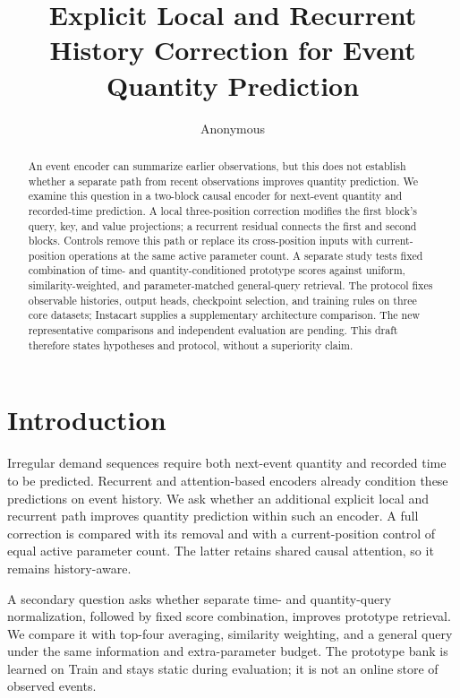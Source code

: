 \documentclass[runningheads]{llncs}
\begin{document}
\title{Explicit Local and Recurrent History Correction for Event Quantity Prediction}
\author{Anonymous}
\maketitle

\begin{abstract}
An event encoder can summarize earlier observations, but this does not
establish whether a separate path from recent observations improves
quantity prediction. We examine this question in a two-block causal
encoder for next-event quantity and recorded-time prediction.
A local three-position correction modifies the first block's query,
key, and value projections; a recurrent residual connects the first
and second blocks. Controls remove this path or replace its
cross-position inputs with current-position operations at the same
active parameter count. A separate study tests fixed combination
of time- and quantity-conditioned prototype scores against uniform,
similarity-weighted, and parameter-matched general-query retrieval.
The protocol fixes observable histories, output heads, checkpoint
selection, and training rules on three core datasets; Instacart
supplies a supplementary architecture comparison. The new
representative comparisons and independent evaluation are pending.
This draft therefore states hypotheses and protocol, without a
superiority claim.
\end{abstract}

\section{Introduction}
Irregular demand sequences require both next-event quantity and
recorded time to be predicted. Recurrent and attention-based encoders
already condition these predictions on event history. We ask whether
an additional explicit local and recurrent path improves quantity
prediction within such an encoder. A full correction is compared
with its removal and with a current-position control of equal active
parameter count. The latter retains shared causal attention, so it
remains history-aware.

A secondary question asks whether separate time- and quantity-query
normalization, followed by fixed score combination, improves
prototype retrieval. We compare it with top-four averaging,
similarity weighting, and a general query under the same information
and extra-parameter budget. The prototype bank is learned on Train
and stays static during evaluation; it is not an online store of
observed events.
\end{document}
